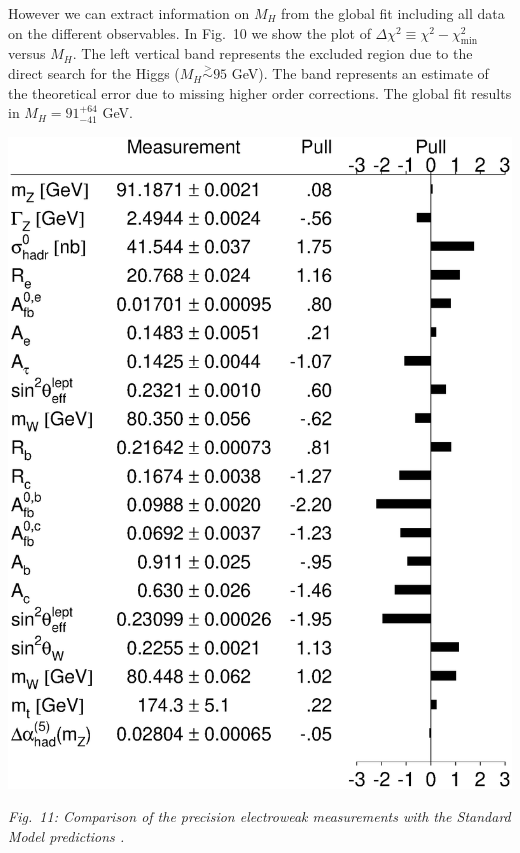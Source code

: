 \documentclass[12pt]{report}
\def\text#1{{\scriptstyle\mathrm{#1}}}
\renewcommand{\gtrsim}{\stackrel{>}{\sim}}
\begin{document}
However we can extract information on $M_H$ from the global fit
including all data on the different observables. In Fig.\ 10 we show
the plot of $\Delta \chi^2 \equiv \chi^2 - \chi^2_{\text{min}}$
versus  $M_H$. The left vertical band represents the excluded region
due to the direct search for the Higgs ($M_H \gtrsim 95$ GeV). The
band represents an estimate of the theoretical error due to missing
higher order corrections. The global fit results in $M_H =
91^{+64}_{-41}$  GeV. 

\null
\vspace{-1cm}
\begin{center}
\includegraphics[scale=0.4]{fig11.eps}
\end{center}

\begin{minipage}[h]{12cm}
\begin{center}
{\it Fig.\ 11: Comparison of the precision electroweak measurements 
with the Standard Model predictions \cite{LepSite}.}
\end{center}
\end{minipage}
\end{document}
